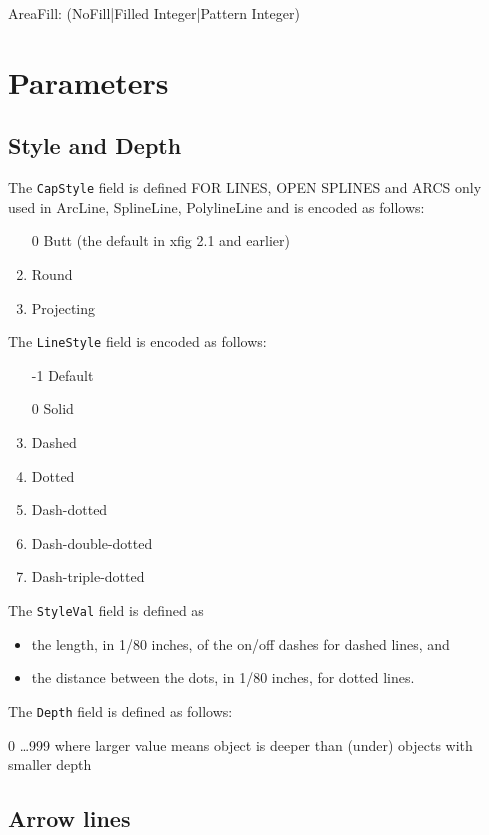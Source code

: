 \documentclass[10pt, a4paper]{article}
\begin{document}
AreaFill: (NoFill|Filled Integer|Pattern Integer)





\section{Parameters}\label{sec:param}

\subsection{Style and Depth}\label{subsec:styDep}

The \texttt{CapStyle} field is defined FOR LINES, OPEN SPLINES and ARCS only 
used in ArcLine, SplineLine, PolylineLine
and is encoded as follows:
%
\begin{enumerate}
\item[0] Butt (the default in xfig 2.1 and earlier)
\item    Round
\item    Projecting
\end{enumerate}

\noindent
The \texttt{LineStyle} field is encoded as follows:
%
\begin{enumerate}
\item[-1] Default
\item[0]  Solid
\item     Dashed
\item     Dotted
\item     Dash-dotted
\item     Dash-double-dotted
\item     Dash-triple-dotted
\end{enumerate}

\noindent
The \texttt{StyleVal} field is defined as 
%
\begin{itemize}
\item
the length, in 1/80 inches, of the on/off dashes for dashed lines, and 
\item
the distance between the dots, in 1/80 inches, for dotted lines.
\end{itemize}

\noindent
The \texttt{Depth} field is defined as follows:

         0 \ldots 999 where larger value means object is deeper than (under)
                   objects with smaller depth

\subsection{Arrow lines}\label{subsec:paramArrowLines}
\end{document}
